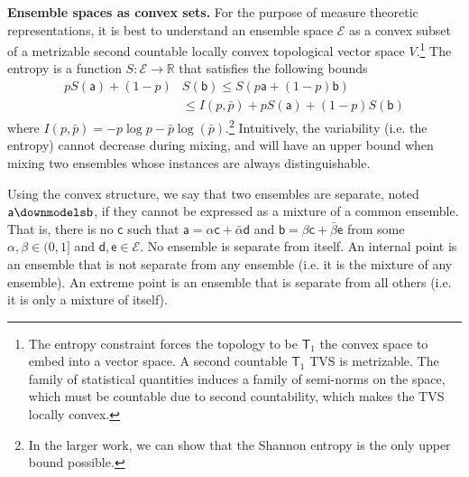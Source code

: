 \documentclass[10pt,twocolumn, nofootinbib]{revtex4-2}
\newcommand{\ens}[1][e] {\mathsf{#1}} %
\newcommand{\Ens}[1][E] {\mathcal{#1}} %
\def\separate{\downmodels}
\begin{document}
\textbf{Ensemble spaces as convex sets.} For the purpose of measure theoretic representations, it is best to understand an ensemble space $\Ens$ as a convex subset of a metrizable second countable locally convex topological vector space $V$.\footnote{The entropy constraint forces the topology to be $\mathsf{T}_1$ the convex space to embed into a vector space. A second countable $\mathsf{T}_1$ TVS is metrizable. The family of statistical quantities induces a family of semi-norms on the space, which must be countable due to second countability, which makes the TVS locally convex.} The entropy is a function $S : \Ens \to \mathbb{R}$ that satisfies the following bounds
\begin{equation}
	\begin{aligned}
		p S(\ens[a]) + (1-p) &S(\ens[b]) \leq S(p \ens[a] + (1-p) \ens[b]) \\
		&\leq I(p,\bar{p}) + p S(\ens[a]) + (1-p) S(\ens[b])
	\end{aligned}
\end{equation}
where $I(p,\bar{p}) = - p \log p - \bar{p} \log(\bar{p})$.\footnote{In the larger work, we can show that the Shannon entropy is the only upper bound possible.}  Intuitively, the variability (i.e. the entropy) cannot decrease during mixing, and will have an upper bound when mixing two ensembles whose instances are always distinguishable.

Using the convex structure, we say that two ensembles are separate, noted $\ens[a] \separate \ens[b]$, if they cannot be expressed as a mixture of a common ensemble. That is, there is no $\ens[c]$ such that $\ens[a] = \alpha \ens[c] + \bar{\alpha} \ens[d]$ and $\ens[b] = \beta \ens[c] + \bar{\beta} \ens$ from some $\alpha, \beta \in (0,1]$ and $\ens[d],\ens \in \Ens$. No ensemble is separate from itself. An internal point is an ensemble that is not separate from any ensemble (i.e. it is the mixture of any ensemble). An extreme point is an ensemble that is separate from all others (i.e. it is only a mixture of itself).
\end{document}
